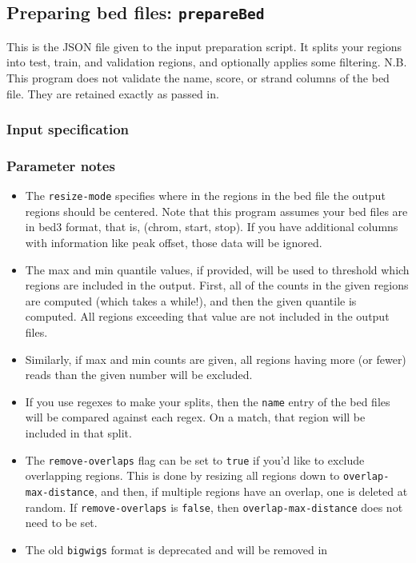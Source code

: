 \documentclass{article}
\begin{document}
\newpage

\subsection{Preparing bed files: \texttt{prepareBed}}\label{prog:prepareBed}

This is the JSON file given to the input preparation script. It splits your regions into
test, train, and validation regions, and optionally applies some filtering.
N.B. This program does not validate the name, score, or strand columns of the bed file.
They are retained exactly as passed in.

\subsubsection{Input specification}



\subsubsection{Parameter notes}

\begin{itemize}
    \item The \texttt{resize-mode} specifies where in the regions in the bed file the output
        regions should be centered. Note that this program assumes your bed files are in bed3
        format, that is, (chrom, start, stop). If you have additional columns with information
        like peak offset, those data will be ignored.
    \item The max and min quantile values, if provided, will be used to threshold which regions
        are included in the output. First, all of the counts in the given regions are computed
        (which takes a while!), and then the given quantile is computed. All regions exceeding
        that value are not included in the output files.
    \item Similarly, if max and min counts are given, all regions having more (or fewer) reads
        than the given number will be excluded.
    \item If you use regexes to make your splits, then the \texttt{name} entry of the bed files
        will be compared against each regex.
        On a match, that region will be included in that split.
    \item The \texttt{remove-overlaps} flag can be set to \texttt{true} if you'd like to exclude
        overlapping regions. This is done by resizing all regions down to
        \texttt{overlap-max-distance}, and then, if multiple regions have an overlap,
        one is deleted at random.
        If \texttt{remove-overlaps} is \texttt{false}, then \texttt{overlap-max-distance}
        does not need to be set.
    \item The old \texttt{bigwigs} format is deprecated and will be removed in \label{dep:oldbigwigs}
\end{itemize}
\end{document}
